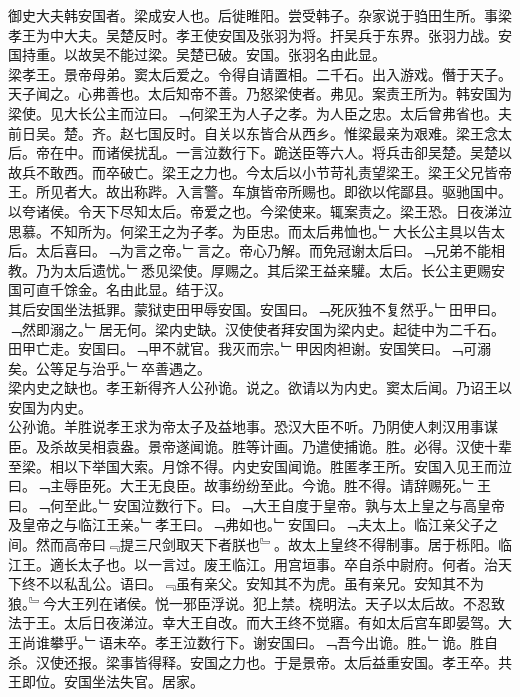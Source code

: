 \documentclass{zhvt-classic}
\begin{document}

\hspace*{2em}御史大夫韩安国者。梁成安人也。后徙睢阳。尝受韩子。杂家说于驺田生所。事梁孝王为中大夫。吴楚反时。孝王使安国及张羽为将。扞吴兵于东界。张羽力战。安国持重。以故吴不能过梁。吴楚已破。安国。张羽名由此显。\\
\hspace*{2em}梁孝王。景帝母弟。窦太后爱之。令得自请置相。二千石。出入游戏。僭于天子。天子闻之。心弗善也。太后知帝不善。乃怒梁使者。弗见。案责王所为。韩安国为梁使。见大长公主而泣曰。﹁何梁王为人子之孝。为人臣之忠。太后曾弗省也。夫前日吴。楚。齐。赵七国反时。自关以东皆合从西乡。惟梁最亲为艰难。梁王念太后。帝在中。而诸侯扰乱。一言泣数行下。跪送臣等六人。将兵击卻吴楚。吴楚以故兵不敢西。而卒破亡。梁王之力也。今太后以小节苛礼责望梁王。梁王父兄皆帝王。所见者大。故出称跸。入言警。车旗皆帝所赐也。即欲以侘鄙县。驱驰国中。以夸诸侯。令天下尽知太后。帝爱之也。今梁使来。辄案责之。梁王恐。日夜涕泣思慕。不知所为。何梁王之为子孝。为臣忠。而太后弗恤也。﹂大长公主具以告太后。太后喜曰。﹁为言之帝。﹂言之。帝心乃解。而免冠谢太后曰。﹁兄弟不能相教。乃为太后遗忧。﹂悉见梁使。厚赐之。其后梁王益亲驩。太后。长公主更赐安国可直千馀金。名由此显。结于汉。\\
\hspace*{2em}其后安国坐法抵罪。蒙狱吏田甲辱安国。安国曰。﹁死灰独不复然乎。﹂田甲曰。﹁然即溺之。﹂居无何。梁内史缺。汉使使者拜安国为梁内史。起徒中为二千石。田甲亡走。安国曰。﹁甲不就官。我灭而宗。﹂甲因肉袒谢。安国笑曰。﹁可溺矣。公等足与治乎。﹂卒善遇之。\\
\hspace*{2em}梁内史之缺也。孝王新得齐人公孙诡。说之。欲请以为内史。窦太后闻。乃诏王以安国为内史。\\
\hspace*{2em}公孙诡。羊胜说孝王求为帝太子及益地事。恐汉大臣不听。乃阴使人刺汉用事谋臣。及杀故吴相袁盎。景帝遂闻诡。胜等计画。乃遣使捕诡。胜。必得。汉使十辈至梁。相以下举国大索。月馀不得。内史安国闻诡。胜匿孝王所。安国入见王而泣曰。﹁主辱臣死。大王无良臣。故事纷纷至此。今诡。胜不得。请辞赐死。﹂王曰。﹁何至此。﹂安国泣数行下。曰。﹁大王自度于皇帝。孰与太上皇之与高皇帝及皇帝之与临江王亲。﹂孝王曰。﹁弗如也。﹂安国曰。﹁夫太上。临江亲父子之间。然而高帝曰﹃提三尺剑取天下者朕也﹄。故太上皇终不得制事。居于栎阳。临江王。適长太子也。以一言过。废王临江。用宫垣事。卒自杀中尉府。何者。治天下终不以私乱公。语曰。﹃虽有亲父。安知其不为虎。虽有亲兄。安知其不为狼。﹄今大王列在诸侯。悦一邪臣浮说。犯上禁。桡明法。天子以太后故。不忍致法于王。太后日夜涕泣。幸大王自改。而大王终不觉寤。有如太后宫车即晏驾。大王尚谁攀乎。﹂语未卒。孝王泣数行下。谢安国曰。﹁吾今出诡。胜。﹂诡。胜自杀。汉使还报。梁事皆得释。安国之力也。于是景帝。太后益重安国。孝王卒。共王即位。安国坐法失官。居家。\\
\end{document}
